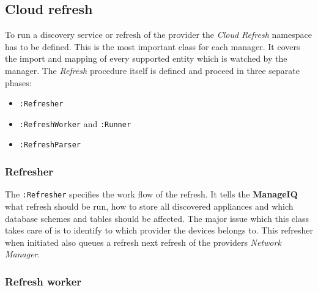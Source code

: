 %

\subsection{Cloud refresh}
\label{sub:Cloud refresh}

To run a discovery service or refresh of the provider the \emph{Cloud Refresh} namespace has to be defined. This is the most important class for each manager. It covers the import and mapping of every supported entity which is watched by the manager. The \emph{Refresh} procedure itself is defined and proceed in three separate phases:

\begin{itemize}
	\item \texttt{:Refresher}
	\item \texttt{:RefreshWorker} and \texttt{:Runner}
	\item \texttt{:RefreshParser}
\end{itemize}

\subsubsection{Refresher}
\label{subs:Refresher}

The \texttt{:Refresher} specifies the work flow of the refresh. It tells the \textbf{ManageIQ} what refresh should be run, how to store all discovered appliances and which database schemes and tables should be affected. The major issue which this class takes care of is to identify to which provider the devices belongs to. This refresher when initiated also queues a refresh next refresh of the providers \emph{Network Manager}.

\subsubsection{Refresh worker}
\label{subs:Refresh worker}

